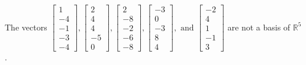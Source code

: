 \begin{exercise}
\begin{exerciseStatement}
  \end{exerciseStatement}
  \begin{exerciseAnswer}
   The vectors \(\left[\begin{array}{r}
1 \\
-4 \\
-1 \\
-3 \\
-4
\end{array}\right] , \left[\begin{array}{r}
2 \\
4 \\
4 \\
-5 \\
0
\end{array}\right] , \left[\begin{array}{r}
2 \\
-8 \\
-2 \\
-6 \\
-8
\end{array}\right] , \left[\begin{array}{r}
-3 \\
0 \\
-3 \\
8 \\
4
\end{array}\right] , \text{ and } \left[\begin{array}{r}
-2 \\
4 \\
1 \\
-1 \\
3
\end{array}\right]\) 
  	 are not  a basis of \(\mathbb{R}^5\).
  


  \end{exerciseAnswer}
\end{exercise}